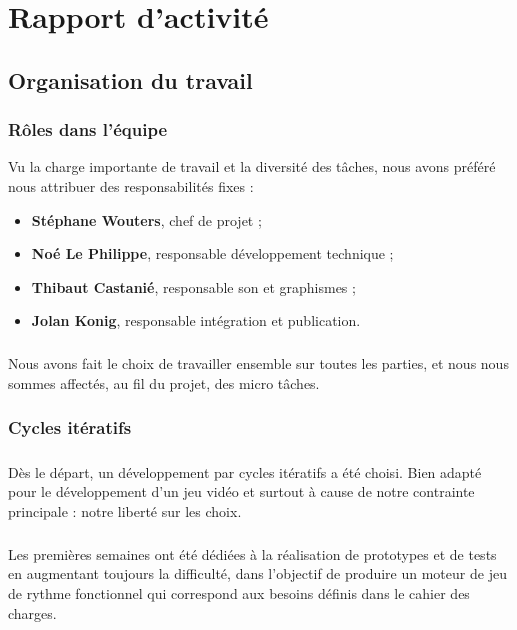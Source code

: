 \chapter{Rapport d'activité}

\section{Organisation du travail}

\subsection{Rôles dans l’équipe}
Vu la charge importante de travail et la diversité des tâches, nous avons préféré nous attribuer des responsabilités fixes :
 
\begin{itemize}
\item \textbf{Stéphane Wouters}, chef de projet ;
\item \textbf{Noé Le Philippe}, responsable développement technique ;
\item \textbf{Thibaut Castanié}, responsable son et graphismes ;
\item \textbf{Jolan Konig}, responsable intégration et publication.
\end{itemize}
 
\paragraph{}
Nous avons fait le choix de travailler ensemble sur toutes les parties, et nous nous sommes affectés, au fil du projet, des micro tâches.

\subsection{Cycles itératifs}
 
\paragraph{}
Dès le départ, un développement par cycles itératifs a été choisi. Bien adapté pour le développement d’un jeu vidéo et surtout à cause de notre contrainte principale : notre liberté sur les choix.
 
\paragraph{}
Les premières semaines ont été dédiées à la réalisation de prototypes et de tests en augmentant toujours la difficulté, dans l’objectif de produire un moteur de jeu de rythme fonctionnel qui correspond aux besoins définis dans le cahier des charges.
 
